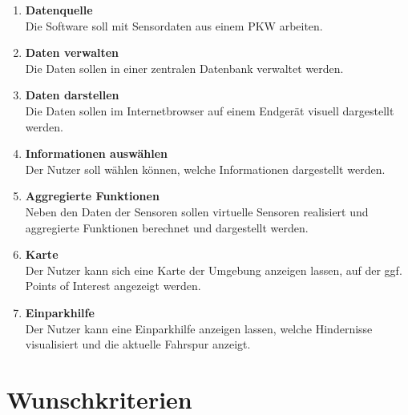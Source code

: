 \documentclass[pflichtenheft.tex]{subfiles}
\begin{document}
\renewcommand{\theenumi}{/MK\ifnum \value{enumi}<10 0\fi\arabic{enumi}0/}
\renewcommand{\labelenumi}{\theenumi}
\renewcommand{\theenumii}{\arabic{enumii}}
\renewcommand{\labelenumii}{/MK\ifnum \value{enumi}<10 0\fi\arabic{enumi}\arabic{enumii}/}

\begin{enumerate}

	\item{\textbf{Datenquelle}} \\Die Software soll mit Sensordaten aus einem PKW arbeiten.

	\item{\textbf{Daten verwalten}} \\Die Daten sollen in einer zentralen Datenbank verwaltet werden.

	\item{\textbf{Daten darstellen}} \\Die Daten sollen im Internetbrowser auf einem Endgerät visuell dargestellt werden.

	\item{\textbf{Informationen auswählen}} \\Der Nutzer soll wählen können, welche Informationen dargestellt werden.

	\item{\textbf{Aggregierte Funktionen}} \\Neben den Daten der Sensoren sollen virtuelle Sensoren realisiert und aggregierte Funktionen berechnet und dargestellt werden.

	\item{\textbf{Karte}} \\Der Nutzer kann sich eine Karte der Umgebung anzeigen lassen, auf der ggf. Points of Interest angezeigt werden.

	\item{\textbf{Einparkhilfe}} \\Der Nutzer kann eine Einparkhilfe anzeigen lassen, welche Hindernisse visualisiert und die aktuelle Fahrspur anzeigt.




\end{enumerate}

\renewcommand{\theenumi}{/WK\ifnum \value{enumi}<10 0\fi\arabic{enumi}0/}
\renewcommand{\labelenumi}{\theenumi}
\renewcommand{\theenumii}{\arabic{enumii}}
\renewcommand{\labelenumii}{/WK\ifnum \value{enumi}<10 0\fi\arabic{enumi}\arabic{enumii}/}
\section{Wunschkriterien}
\end{document}
